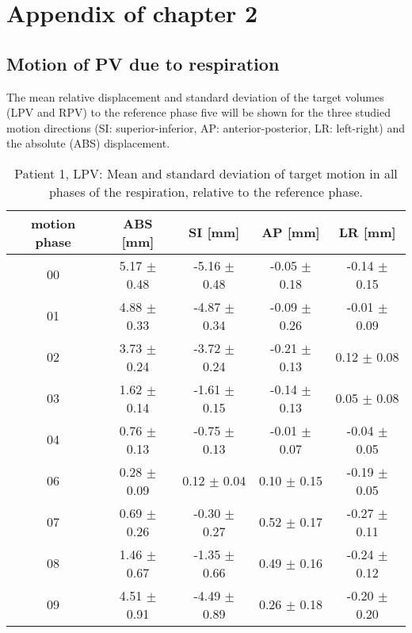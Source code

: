 

\chapter{Appendix of chapter 2}
\label{app:mdacc}

\section{Motion of PV due to respiration}
\label{app:mdacc:motion}

The mean relative displacement and standard deviation of the target volumes (LPV and RPV) to the reference phase five will be shown for the 
three studied motion directions (SI: superior-inferior, AP: anterior-posterior, LR: left-right) and the absolute (ABS) displacement. 


\begin{table}[H]
  \centering
  \caption{Patient 1, LPV: Mean and standard deviation of target motion in all phases of the respiration, relative to the reference phase.}
  \begin{tabular}{|c|c|c|c|c|}
    \hline\hline
    motion phase & ABS [mm] & SI [mm] & AP [mm] & LR [mm]\\
    \hline 
    00& 5.17 $\pm$ 0.48& -5.16 $\pm$ 0.48& -0.05 $\pm$ 0.18& -0.14 $\pm$ 0.15 \\
01& 4.88 $\pm$ 0.33& -4.87 $\pm$ 0.34& -0.09 $\pm$ 0.26& -0.01 $\pm$ 0.09 \\
02& 3.73 $\pm$ 0.24& -3.72 $\pm$ 0.24& -0.21 $\pm$ 0.13& 0.12 $\pm$ 0.08 \\
03& 1.62 $\pm$ 0.14& -1.61 $\pm$ 0.15& -0.14 $\pm$ 0.13& 0.05 $\pm$ 0.08 \\
04& 0.76 $\pm$ 0.13& -0.75 $\pm$ 0.13& -0.01 $\pm$ 0.07& -0.04 $\pm$ 0.05 \\
06& 0.28 $\pm$ 0.09& 0.12 $\pm$ 0.04& 0.10 $\pm$ 0.15& -0.19 $\pm$ 0.05 \\
07& 0.69 $\pm$ 0.26& -0.30 $\pm$ 0.27& 0.52 $\pm$ 0.17& -0.27 $\pm$ 0.11 \\
08& 1.46 $\pm$ 0.67& -1.35 $\pm$ 0.66& 0.49 $\pm$ 0.16& -0.24 $\pm$ 0.12 \\
09& 4.51 $\pm$ 0.91& -4.49 $\pm$ 0.89& 0.26 $\pm$ 0.18& -0.20 $\pm$ 0.20 \\
        \hline\hline
  \end{tabular}
\end{table}

